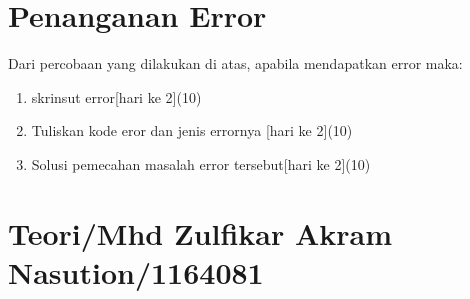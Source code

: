 \section{Penanganan Error}
Dari percobaan yang dilakukan di atas, apabila mendapatkan error maka:

\begin{enumerate}
	\item
	skrinsut error[hari ke 2](10)
	\item
Tuliskan kode eror dan jenis errornya [hari ke 2](10)
	\item
Solusi pemecahan masalah error tersebut[hari ke 2](10)

\end{enumerate}

\section{Teori/Mhd Zulfikar Akram Nasution/1164081}
